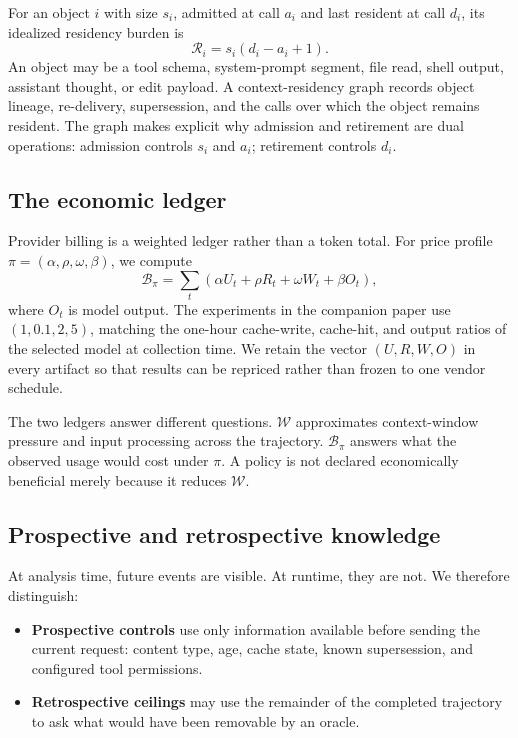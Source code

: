 \documentclass[10pt,twocolumn]{article}
\begin{document}
For an object $i$ with size $s_i$, admitted at call $a_i$ and last resident at call $d_i$, its idealized
residency burden is
\begin{equation}
\mathcal{R}_i=s_i(d_i-a_i+1).
\end{equation}
An object may be a tool schema, system-prompt segment, file read, shell output, assistant thought, or
edit payload.  A context-residency graph records object lineage, re-delivery, supersession, and the
calls over which the object remains resident.  The graph makes explicit why admission and retirement
are dual operations: admission controls $s_i$ and $a_i$; retirement controls $d_i$.

\subsection{The economic ledger}

Provider billing is a weighted ledger rather than a token total.  For price profile
$\pi=(\alpha,\rho,\omega,\beta)$, we compute
\begin{equation}
\mathcal{B}_{\pi}=\sum_t(\alpha U_t+\rho R_t+\omega W_t+\beta O_t),
\end{equation}
where $O_t$ is model output.  The experiments in the companion paper use
$(1,0.1,2,5)$, matching the one-hour cache-write, cache-hit, and output ratios of the selected model
at collection time.  We retain the vector $(U,R,W,O)$ in every artifact so that results can be
repriced rather than frozen to one vendor schedule.

The two ledgers answer different questions.  $\mathcal{W}$ approximates context-window pressure and
input processing across the trajectory.  $\mathcal{B}_{\pi}$ answers what the observed usage would
cost under $\pi$.  A policy is not declared economically beneficial merely because it reduces
$\mathcal{W}$.

\subsection{Prospective and retrospective knowledge}

At analysis time, future events are visible.  At runtime, they are not.  We therefore distinguish:

\begin{itemize}
  \item \textbf{Prospective controls} use only information available before sending the current
  request: content type, age, cache state, known supersession, and configured tool permissions.
  \item \textbf{Retrospective ceilings} may use the remainder of the completed trajectory to ask what
  would have been removable by an oracle.
\end{itemize}
\end{document}
